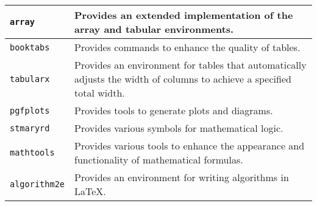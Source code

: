 \documentclass[11pt]{report}
\begin{document}
\begin{tabularx}{\linewidth}{|X|X|}
		\hline
		\verb|array|            & Provides an extended implementation of the array and tabular environments.                                             \\
		\hline
		\verb|booktabs|         & Provides commands to enhance the quality of tables.                                                                    \\
		\hline
		\verb|tabularx|         & Provides an environment for tables that automatically adjusts the width of columns to achieve a specified total width. \\
		\hline
		\verb|pgfplots|         & Provides tools to generate plots and diagrams.                                                                         \\
		\hline
		\verb|stmaryrd|         & Provides various symbols for mathematical logic.                                                                       \\
		\hline
		\verb|mathtools|        & Provides various tools to enhance the appearance and functionality of mathematical formulas.                           \\
		\hline
		\verb|algorithm2e|      & Provides an environment for writing algorithms in LaTeX.                                                               \\
	\end{tabularx}
\end{document}
